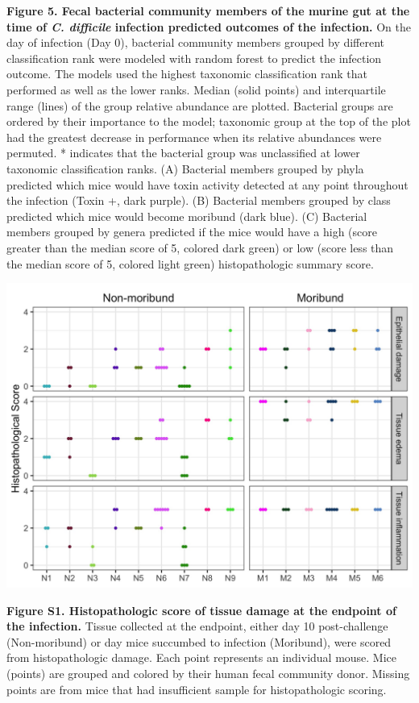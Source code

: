 \documentclass[
  12pt,
]{article}
\begin{document}
\textbf{Figure 5. Fecal bacterial community members of the murine gut at
the time of \emph{C. difficile} infection predicted outcomes of the
infection.} On the day of infection (Day 0), bacterial community members
grouped by different classification rank were modeled with random forest
to predict the infection outcome. The models used the highest taxonomic
classification rank that performed as well as the lower ranks. Median
(solid points) and interquartile range (lines) of the group relative
abundance are plotted. Bacterial groups are ordered by their importance
to the model; taxonomic group at the top of the plot had the greatest
decrease in performance when its relative abundances were permuted. *
indicates that the bacterial group was unclassified at lower taxonomic
classification ranks. (A) Bacterial members grouped by phyla predicted
which mice would have toxin activity detected at any point throughout
the infection (Toxin +, dark purple). (B) Bacterial members grouped by
class predicted which mice would become moribund (dark blue). (C)
Bacterial members grouped by genera predicted if the mice would have a
high (score greater than the median score of 5, colored dark green) or
low (score less than the median score of 5, colored light green)
histopathologic summary score.

\hfill\break

\includegraphics{../results/figures/figure_S1.jpg}

\textbf{Figure S1. Histopathologic score of tissue damage at the
endpoint of the infection.} Tissue collected at the endpoint, either day
10 post-challenge (Non-moribund) or day mice succumbed to infection
(Moribund), were scored from histopathologic damage. Each point
represents an individual mouse. Mice (points) are grouped and colored by
their human fecal community donor. Missing points are from mice that had
insufficient sample for histopathologic scoring.
\end{document}
